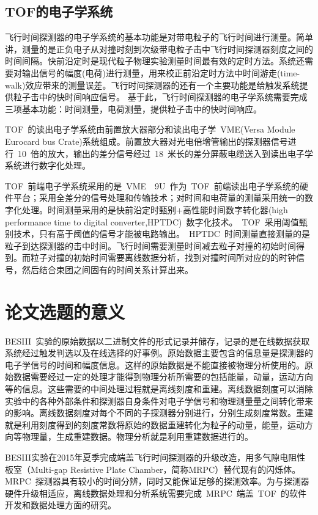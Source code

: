 \subsection{TOF的电子学系统}
飞行时间探测器的电子学系统的基本功能是对带电粒子的飞行时间进行测量。简单讲，测量的是正负电子从对撞时刻到次级带电粒子击中飞行时间探测器刻度之间的时间间隔。快前沿定时是现代粒子物理实验测量时间最有效的定时方法。系统还需要对输出信号的幅度(电荷)进行测量，用来校正前沿定时方法中时间游走(time-walk)效应带来的测量误差。飞行时间探测器的还有一个主要功能是给触发系统提供粒子击中的快时间响应信号。
基于此，飞行时间探测器的电子学系统需要完成三项基本功能：时间测量，电荷测量，提供粒子击中的快时间响应。

TOF~的读出电子学系统由前置放大器部分和读出电子学~VME(Versa Module Eurocard bus Crate)系统组成。前置放大器对光电倍增管输出的探测器信号进行~10~倍的放大，输出的差分信号经过~18~米长的差分屏蔽电缆送入到读出电子学系统进行数字化处理。

TOF~前端电子学系统采用的是~VME$\quad$9U~作为~TOF~前端读出电子学系统的硬件平台；采用全差分的信号处理和传输技术；对时间和电荷量的测量采用统一的数字化处理。时间测量采用的是快前沿定时甄别+高性能时间数字转化器(high performance time to digital converter,HPTDC)~数字化技术。~TOF~采用阈值甄别技术，只有高于阈值的信号才能被电路输出。~HPTDC~时间测量直接测量的是粒子到达探测器的击中时间。飞行时间需要测量时间减去粒子对撞的初始时间得到。而粒子对撞的初始时间需要离线数据分析，找到对撞时间所对应的的时钟信号，然后结合束团之间固有的时间关系计算出来。

\section{论文选题的意义}

BESIII~实验的原始数据以二进制文件的形式记录并储存，记录的是在线数据获取系统经过触发判选以及在线选择的好事例。原始数据主要包含的信息量是探测器的电子学信号的时间和幅度信息。这样的原始数据是不能直接被物理分析使用的。原始数据需要经过一定的处理才能得到物理分析所需要的包括能量，动量，运动方向等的信息。这些需要的中间处理过程就是离线刻度和重建。离线数据刻度可以消除实验中的各种外部条件和探测器自身条件对电子学信号和物理测量量之间转化带来的影响。离线数据刻度对每个不同的子探测器分别进行，分别生成刻度常数。重建就是利用刻度得到的刻度常数将原始的数据重建转化为粒子的动量，能量，运动方向等物理量，生成重建数据。物理分析就是利用重建数据进行的。~\cite{wangyf2011}

BESIII实验在2015年夏季完成端盖飞行时间探测器的升级改造，用多气隙电阻性板室（Multi-gap Resistive Plate Chamber，简称MRPC）替代现有的闪烁体。MRPC~探测器具有较小的时间分辨，同时又能保证足够的探测效率。为与探测器硬件升级相适应，离线数据处理和分析系统需要完成~MRPC~端盖~TOF~的软件开发和数据处理方面的研究。

